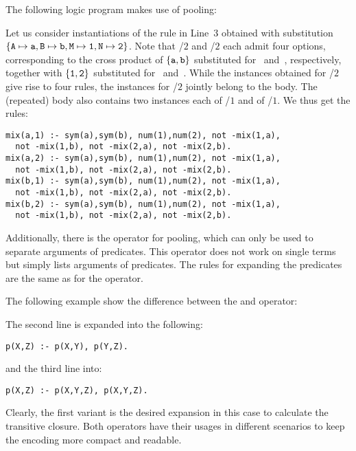 \begin{example}\label{ex:pool}
The following logic program makes use of pooling:
%

%
Let us consider instantiations of the rule in Line~3 obtained with substitution 
$\{\var{A}\mapsto\const{a},\linebreak[1]\var{B}\mapsto\const{b},
   \var{M}\mapsto\const{1},\var{N}\mapsto\const{2}\}$.
Note that /$2$ and /$2$ each admit four options,
corresponding to the cross product of $\{\texttt{a},\texttt{b}\}$ substituted
for~ and~, respectively, together with $\{\texttt{1},\texttt{2}\}$
substituted for~ and~.
While the instances obtained for /$2$ give rise to four rules,
the instances for /$2$ jointly belong to the body.
The (repeated) body also contains two instances each of /$1$ and of /$1$.
We thus get the rules:%
%
\begin{lstlisting}[numbers=none]
mix(a,1) :- sym(a),sym(b), num(1),num(2), not -mix(1,a),
  not -mix(1,b), not -mix(2,a), not -mix(2,b).
mix(a,2) :- sym(a),sym(b), num(1),num(2), not -mix(1,a),
  not -mix(1,b), not -mix(2,a), not -mix(2,b).
mix(b,1) :- sym(a),sym(b), num(1),num(2), not -mix(1,a),
  not -mix(1,b), not -mix(2,a), not -mix(2,b).
mix(b,2) :- sym(a),sym(b), num(1),num(2), not -mix(1,a),
  not -mix(1,b), not -mix(2,a), not -mix(2,b).
\end{lstlisting}
\eexample
\end{example}
%
Additionally, there is the \code{;;} operator for pooling, 
which can only be used to separate arguments of predicates.
This operator does not work on single terms but
simply lists arguments of predicates.
The rules for expanding the predicates are the same as for the \code{;} operator.

\begin{example}\label{ex:sep}
The following example show the difference between the \code{;} and \code{;;} operator:
%

%
The second line is expanded into the following:
\begin{lstlisting}[firstnumber=2]
p(X,Z) :- p(X,Y), p(Y,Z). 
\end{lstlisting}%
and the third line into:
\begin{lstlisting}[firstnumber=3]
p(X,Z) :- p(X,Y,Z), p(X,Y,Z).
\end{lstlisting}%
Clearly, the first variant is the desired expansion in this case 
to calculate the transitive closure.
Both operators have their usages in different scenarios 
to keep the encoding more compact and readable.
\eexample
\end{example}


